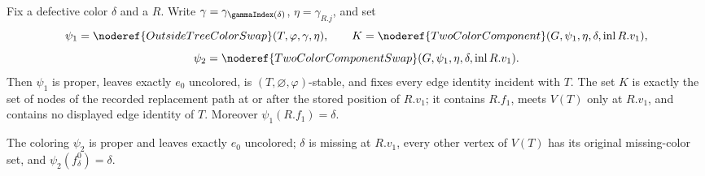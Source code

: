 \begin{helper}
Fix a defective color $\delta$ and a
 $R$.  Write
$\gamma=\gamma_{\gammaIndex(\delta)}$, $\eta=\gamma_{R.j}$, and set
\[
 \psi_1=\noderef{OutsideTreeColorSwap}(T,\varphi,\gamma,\eta),
 \qquad
 K=\noderef{TwoColorComponent}
      (G,\psi_1,\eta,\delta,\operatorname{inl}R.v_1),
\]
\[
 \psi_2=\noderef{TwoColorComponentSwap}
      (G,\psi_1,\eta,\delta,\operatorname{inl}R.v_1).
\]
Then $\psi_1$ is proper, leaves exactly $e_0$ uncolored, is
$(T,\varnothing,\varphi)$-stable, and fixes every edge identity incident
with $T$.  The set $K$ is
exactly the set of nodes of the recorded replacement path at or after
the stored position of $R.v_1$; it contains $R.f_1$, meets $V(T)$ only
at $R.v_1$, and contains no displayed edge identity of $T$.  Moreover
$\psi_1(R.f_1)=\delta$.

The coloring $\psi_2$ is proper and leaves exactly $e_0$ uncolored;
$\delta$ is missing at $R.v_1$, every other vertex of $V(T)$ has its
original missing-color set, and
$\psi_2(f^0_\delta)=\delta$.
\end{helper}
